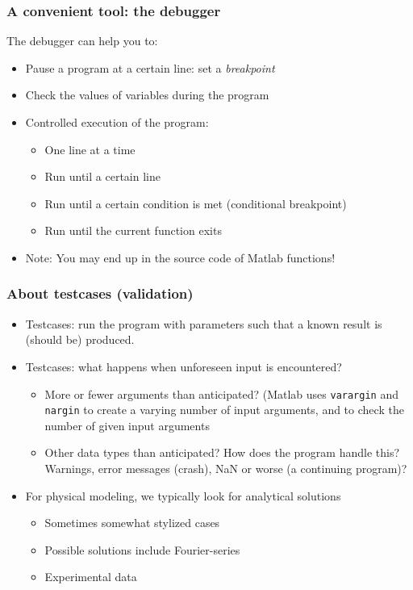 \documentclass[11pt,table,final,fleqn,xcolor={usenames,dvipsnames},unknownkeysallowed]{beamer}
\begin{document}
\begin{frame}
\frametitle{A convenient tool: the debugger}
The debugger can help you to:
\begin{itemize}
  \item Pause a program at a certain line: set a \emph{breakpoint}
  \item Check the values of variables during the program
  \item Controlled execution of the program:
  \begin{itemize}
    \item One line at a time
    \item Run until a certain line
    \item Run until a certain condition is met (conditional breakpoint)
    \item Run until the current function exits
  \end{itemize}
  \item Note: You may end up in the source code of Matlab functions!
\end{itemize}
\end{frame}
% 
\begin{frame}
  \frametitle{About testcases (validation)}
  \begin{itemize}
    \item Testcases: run the program with parameters such that a known result is (should be) produced.
    \item Testcases: what happens when unforeseen input is encountered?
    \begin{itemize}
      \item More or fewer arguments than anticipated? (Matlab uses \lstinline$varargin$ and \lstinline$nargin$ to create a varying number of input arguments, and to check the number of given input arguments
      \item Other data types than anticipated? How does the program handle this? Warnings, error messages (crash), NaN or worse (a continuing program)?
    \end{itemize}
    \item For physical modeling, we typically look for analytical solutions
    \begin{itemize}
      \item Sometimes somewhat stylized cases
      \item Possible solutions include Fourier-series
      \item Experimental data
    \end{itemize}

  \end{itemize}
\end{frame}
\end{document}
